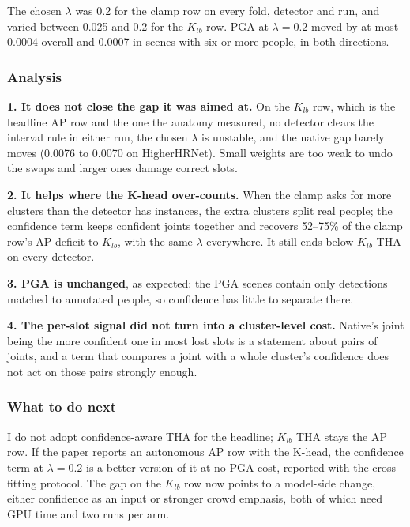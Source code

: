\vspace{0.5em}

The chosen $\lambda$ was 0.2 for the clamp row on every fold, detector and run, and varied between 0.025 and 0.2 for the $K_{lb}$ row.
PGA at $\lambda = 0.2$ moved by at most 0.0004 overall and 0.0007 in scenes with six or more people, in both directions.

\subsubsection{Analysis}

\textbf{1. It does not close the gap it was aimed at.} On the $K_{lb}$ row, which is the headline AP row and the one the anatomy measured, no detector clears the interval rule in either run, the chosen $\lambda$ is unstable, and the native gap barely moves (0.0076 to 0.0070 on HigherHRNet). Small weights are too weak to undo the swaps and larger ones damage correct slots.

\textbf{2. It helps where the K-head over-counts.} When the clamp asks for more clusters than the detector has instances, the extra clusters split real people; the confidence term keeps confident joints together and recovers 52--75\% of the clamp row's AP deficit to $K_{lb}$, with the same $\lambda$ everywhere. It still ends below $K_{lb}$ THA on every detector.

\textbf{3. PGA is unchanged}, as expected: the PGA scenes contain only detections matched to annotated people, so confidence has little to separate there.

\textbf{4. The per-slot signal did not turn into a cluster-level cost.} Native's joint being the more confident one in most lost slots is a statement about pairs of joints, and a term that compares a joint with a whole cluster's confidence does not act on those pairs strongly enough.

\subsubsection{What to do next}

I do not adopt confidence-aware THA for the headline; $K_{lb}$ THA stays the AP row.
If the paper reports an autonomous AP row with the K-head, the confidence term at $\lambda = 0.2$ is a better version of it at no PGA cost, reported with the cross-fitting protocol.
The gap on the $K_{lb}$ row now points to a model-side change, either confidence as an input or stronger crowd emphasis, both of which need GPU time and two runs per arm.


